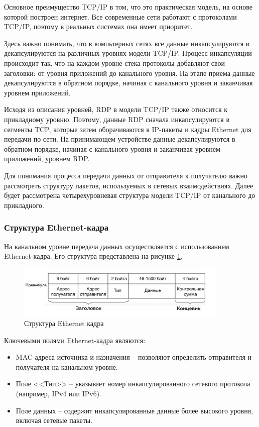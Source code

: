\documentclass[bachelor, och, coursework]{SCWorks}
\begin{document}
Основное преимущество TCP/IP в том, что это практическая модель, на основе которой построен интернет. Все современные сети работают 
с протоколами TCP/IP, поэтому в реальных системах она имеет приоритет.

Здесь важно понимать, что в компьтерных сетях все данные инкапсулируются и декапсулируются на различных уровнях модели TCP/IP.
Процесс инкапсуляции происходит так, что на каждом уровне стека 
протоколы добавляют свои заголовки: от уровня приложений до канального уровня. На этапе приема данные декапсулируются в обратном порядке, начиная 
с канального уровня и заканчивая уровнем приложений. 

Исходя из описания уровней, RDP в модели TCP/IP также относится к прикладному уровню. Поэтому, данные RDP сначала инкапсулируются в сегменты TCP, 
которые затем оборачиваются в IP-пакеты и кадры Ethernet для передачи по сети. На принимающем устройстве данные декапсулируются в обратном 
порядке, начиная с канального уровня и заканчивая уровнем приложений, уровнем RDP.

Для понимания процесса передачи данных от отправителя к получателю важно рассмотреть структуру пакетов, используемых в сетевых взаимодействиях. Далее
будет рассмотрена четырехуровневая структура модели TCP/IP от канального до прикладного. 


\subsubsection{Структура Ethernet-кадра}

На канальном уровне передача данных осуществляется с использованием Ethernet-кадра. Его структура представлена на рисунке \ref{eth-frame}.

\begin{figure}[H]
  \centering
  \includegraphics[width=0.9\textwidth]{pics/eth-frame.jpg}
  \caption{Структура Ethernet кадра}
  \label{eth-frame}
\end{figure}

Ключевыми полями Ethernet-кадра являются:

\begin{itemize}
  \item MAC-адреса источника и назначения -- позволяют определить отправителя и получателя на канальном уровне.
  \item Поле <<Тип>> -- указывает номер инкапсулированного сетевого протокола (например, IPv4 или IPv6).
  \item Поле данных -- содержит инкапсулированные данные более высокого уровня, включая сетевые пакеты.
\end{itemize}
\end{document}
